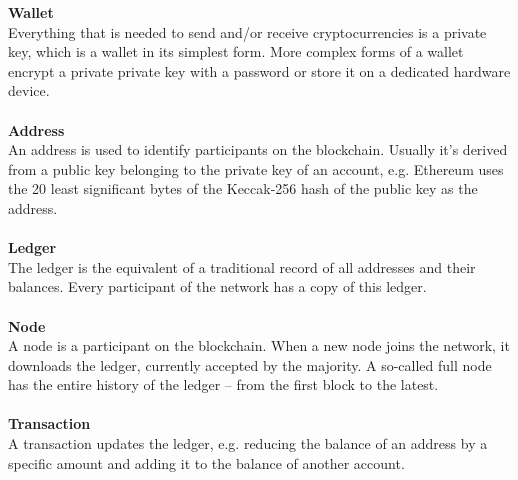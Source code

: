\textbf{Wallet}\\
Everything that is needed to send and/or receive cryptocurrencies is a private key\cite{bitcoin-whitepaper}, which is a wallet in its simplest form.
More complex forms of a wallet encrypt a private private key with a password or store it on a dedicated hardware device.
\\\\

\textbf{Address}\\
An address is used to identify participants on the blockchain.
Usually it's derived from a public key belonging to the private key of an account, e.g. Ethereum uses the 20 least significant bytes of the Keccak-256 hash of the public key as the address\cite{ethereum-yellow-paper}.
\\\\

\textbf{Ledger}\\
The ledger is the equivalent of a traditional record of all addresses and their balances.
Every participant of the network has a copy of this ledger.
\\\\

\textbf{Node}\\
A node is a participant on the blockchain.
When a new node joins the network, it downloads the ledger, currently accepted by the majority.
A so-called full node has the entire history of the ledger – from the first block to the latest.
\\\\

\textbf{Transaction}\\
A transaction updates the ledger, e.g. reducing the balance of an address by a specific amount and adding it to the balance of another account.
\\\\

